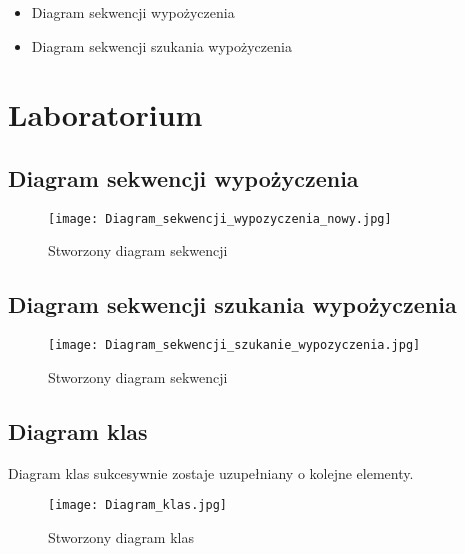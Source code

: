 \documentclass{article}
\begin{document}
	\begin{itemize}
		\item Diagram sekwencji wypożyczenia
		\item Diagram sekwencji szukania wypożyczenia
	\end{itemize}
	\newpage
	\section{Laboratorium}
	\subsection{ Diagram sekwencji wypożyczenia}
\begin{figure}[!ht]
	\centering
	\texttt{[image: Diagram\_sekwencji\_wypozyczenia\_nowy.jpg]}
	\caption{Stworzony diagram sekwencji}
	\label{fig:obrazek 1}
\end{figure}
	\newpage
	\subsection{Diagram sekwencji szukania wypożyczenia }
	\begin{figure}[!ht]
	\centering
\texttt{[image: Diagram\_sekwencji\_szukanie\_wypozyczenia.jpg]}
\caption{Stworzony diagram sekwencji}
\label{fig:obrazek 2}
	\end{figure}
\subsection{Diagram klas}
Diagram klas sukcesywnie zostaje uzupełniany o kolejne elementy.
	\begin{figure}[!ht]
	\centering
	\texttt{[image: Diagram\_klas.jpg]}
	\caption{Stworzony diagram klas}
	\label{fig:obrazek 3}
\end{figure}
\end{document}

